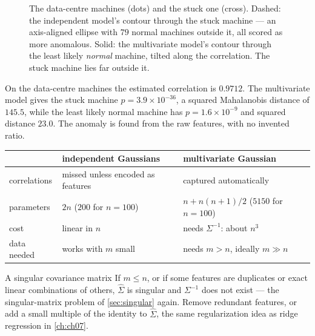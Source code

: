 \begin{figure}[htbp]
  \caption{The data-centre machines (dots) and the stuck one (cross). Dashed: the
  independent model's contour through the stuck machine --- an axis-aligned
  ellipse with $79$ normal machines outside it, all scored as more anomalous.
  Solid: the multivariate model's contour through the least likely
  \emph{normal} machine, tilted along the correlation. The stuck machine lies
  far outside it.}
  \label{fig:multivariate}
\end{figure}

On the data-centre machines the estimated correlation is $0.9712$. The
multivariate model gives the stuck machine $p = 3.9\times10^{-36}$, a squared
Mahalanobis distance of $145.5$, while the least likely normal machine has
$p = 1.6\times10^{-9}$ and squared distance $23.0$. The anomaly is found from the
raw features, with no invented ratio.

\begin{center}
\small
\renewcommand{\arraystretch}{1.3}
\begin{tabular}{@{}L{3.1cm}L{4.1cm}L{4.1cm}@{}}
\toprule
 & independent Gaussians & multivariate Gaussian\\
\midrule
correlations & missed unless encoded as features & captured automatically\\
parameters & $2n$ ($200$ for $n = 100$) & $n + n(n+1)/2$ ($5150$ for $n = 100$)\\
cost & linear in $n$ & needs $\Sigma^{-1}$: about $n^3$\\
data needed & works with $m$ small & needs $m > n$, ideally $m \gg n$\\
\bottomrule
\end{tabular}
\end{center}

\begin{pitfall}{A singular covariance matrix}
If $m \le n$, or if some features are duplicates or exact linear combinations of
others, $\hat\Sigma$ is singular and $\Sigma^{-1}$ does not exist --- the
singular-matrix problem of \cref{sec:singular} again. Remove redundant features,
or add a small multiple of the identity to $\hat\Sigma$, the same regularization
idea as ridge regression in \cref{ch:ch07}.
\end{pitfall}

